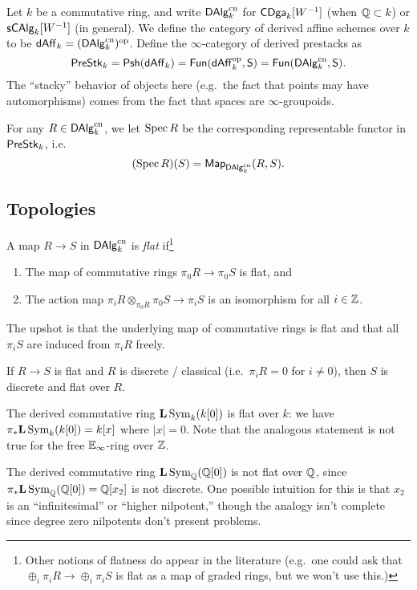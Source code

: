 \documentclass{amsart}
\begin{document}
Let $k$ be a commutative ring, and write $\mathsf{DAlg}_k^{\mathrm{cn}}$ for $\mathsf{CDga}_k[W^{-1}]$ (when $\mathbb{Q} \subset k$) or $\mathsf{s}\mathsf{CAlg}_k[W^{-1}]$ (in general).
We define the category of derived affine schemes over $k$ to be $\mathsf{dAff}_k = (\mathsf{DAlg}_k^{\mathrm{cn}})^{\mathrm{op}}$.
Define the $\infty$-category of derived prestacks as
\[
	\mathsf{PreStk}_k = \mathsf{Psh}(\mathsf{dAff}_k) = \mathsf{Fun}(\mathsf{dAff}_k^{\mathrm{op}}, \mathsf{S}) = \mathsf{Fun}(\mathsf{DAlg}_k^{\mathrm{cn}}, \mathsf{S}).
\]
The ``stacky'' behavior of objects here (e.g.\ the fact that points may have automorphisms) comes from the fact that spaces are $\infty$-groupoids.

For any $R \in \mathsf{DAlg}_k^{\mathrm{cn}}$, we let $\operatorname{Spec} R$ be the corresponding representable functor in $\mathsf{PreStk}_k$, i.e.\
\[
	(\operatorname{Spec} R)(S) = \mathsf{Map}_{\mathsf{DAlg}_k^{\mathrm{cn}}}(R, S).
\]

\subsection{Topologies}

\begin{dfn}
	A map $R \to S$ in $\mathsf{DAlg}_k^{\mathrm{cn}}$ is \emph{flat} if\footnote{Other notions of flatness do appear in the literature (e.g.\ one could ask that $\oplus_i \pi_i R \to \oplus_i \pi_i S$ is flat as a map of graded rings, but we won't use this.)}
	\begin{enumerate}
		\item The map of commutative rings $\pi_0 R \to \pi_0 S$ is flat, and
		\item The action map $\pi_i R \otimes_{\pi_0 R} \pi_0 S \to \pi_i S$ is an isomorphism for all $i \in \mathbb{Z}$.
	\end{enumerate}
\end{dfn}

The upshot is that the underlying map of commutative rings is flat and that all $\pi_i S$ are induced from $\pi_i R$ freely.

\begin{ex}
	If $R \to S$ is flat and $R$ is discrete / classical (i.e.\ $\pi_i R = 0$ for $i \neq 0$), then $S$ is discrete and flat over $R$.
\end{ex}

\begin{ex}
	The derived commutative ring $\mathbf{L} \operatorname{Sym}_k (k[0])$ is flat over $k$: we have $\pi_* \mathbf{L} \operatorname{Sym}_k (k[0]) = k[x]$ where $|x| = 0$.
	Note that the analogous statement is not true for the free $\mathbb{E}_\infty$-ring over $\mathbb{Z}$.
\end{ex}

\begin{ex}
	The derived commutative ring $\mathbf{L} \operatorname{Sym}_{\mathbb{Q}} (\mathbb{Q}[0])$ is not flat over $\mathbb{Q}$, since $\pi_* \mathbf{L} \operatorname{Sym}_{\mathbb{Q}} (\mathbb{Q}[0]) = \mathbb{Q}[x_2]$ is not discrete.
	One possible intuition for this is that $x_2$ is an ``infinitesimal'' or ``higher nilpotent,'' though the analogy isn't complete since degree zero nilpotents don't present problems.
\end{ex}
\end{document}
